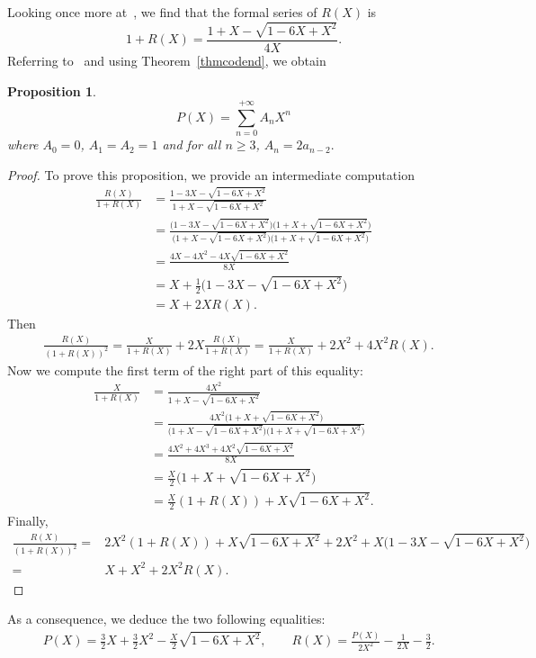 \documentclass[10pt,a4paper]{amsart}
\numberwithin{equation}{section}
\theoremstyle{definition}
\theoremstyle{plain}
\newtheorem{Prop}[defi]{Proposition}
\begin{document}
Looking once more at~\cite{OEIS}, we find that the formal series of $R(X)$ is
\begin{equation*}
	1+R(X)=\frac{1+X-\sqrt{1-6X+X^2}}{4X}.
\end{equation*}
Referring to~\cite{OEIS} and using Theorem~\ref{thmcodend}, we obtain
\begin{Prop}\label{nbcodend}
	\[
	P(X)=\sum_{n=0}^{+\infty} A_nX^n
	\]
	where $A_0=0$, $A_1=A_2=1$ and for all $n\geq 3$, $A_n=2a_{n-2}.$
\end{Prop}
\begin{proof}
	To prove this proposition, we provide an intermediate computation
	\begin{align}
		\frac{R(X)}{1+R(X)}
		&=\frac{1-3X-\sqrt{1-6X+X^2}}{1+X-\sqrt{1-6X+X^2}} \nonumber \\
		&=\frac{\big(1-3X-\sqrt{1-6X+X^2}\big)\big(1+X+\sqrt{1-6X+X^2}\big)}{\big(1+X-\sqrt{1-6X+X^2}\big)\big(1+X+\sqrt{1-6X+X^2}\big)} \nonumber \\
		&=\frac{4X-4X^2-4X\sqrt{1-6X+X^2}}{8X} \nonumber \\
		&=X+\frac{1}{2}\big(1-3X-\sqrt{1-6X+X^2}\big) \nonumber \\
		&=X+2XR(X). \label{cal:PrimCoass}
	\end{align}
Then
 \begin{align*}
	&\frac{R(X)}{(1+R(X))^2}=\frac{X}{1+R(X)}+2X\frac{R(X)}{1+R(X)} =\frac{X}{1+R(X)}+2X^2+4X^2R(X).
\end{align*}
Now we compute the first term of the right part of this equality:
\begin{align*}
	\frac{X}{1+R(X)}&=\frac{4X^2}{1+X-\sqrt{1-6X+X^2}} \\
					&=\frac{4X^2\big(1+X+\sqrt{1-6X+X^2}\big)}{\big(1+X-\sqrt{1-6X+X^2}\big)\big(1+X+\sqrt{1-6X+X^2}\big)} \\
					&=\frac{4X^2+4X^3+4X^2\sqrt{1-6X+X^2}}{8X} \\
					&=\frac{X}{2}\big(1+X+\sqrt{1-6X+X^2}\big) \\
					&=\frac{X}{2}(1+R(X))+X\sqrt{1-6X+X^2}.
\end{align*}
Finally,
\begin{align*}
	\frac{R(X)}{(1+R(X))^2}
	={}&2X^2(1+R(X))+X\sqrt{1\!-\!6X\!+\!X^2}+2X^2+X\big(1-3X-\sqrt{1\!-\!6X\!+\!X^2}\big) \\
	={}& X+X^2+2X^2R(X). \tag*{\qed}
\end{align*}
\renewcommand{\qed}{}
\end{proof}

As a consequence, we deduce the two following equalities:
\begin{align*}
	&P(X)=\frac{3}{2}X+\frac{3}{2}X^2-\frac{X}{2}\sqrt{1-6X+X^2}, \qquad
	R(X)=\frac{P(X)}{2X^2}-\frac{1}{2X}-\frac{3}{2}.
\end{align*}
\end{document}
